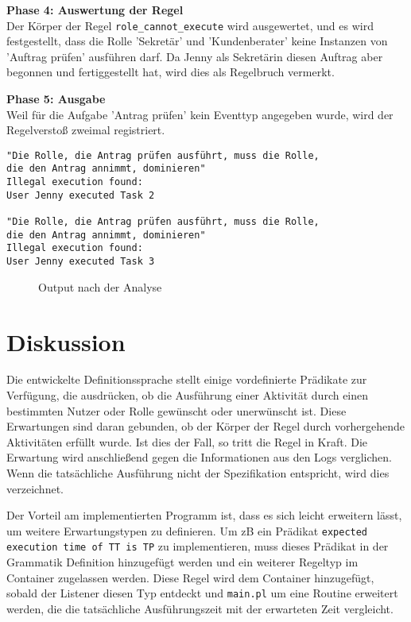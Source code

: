 \textbf{Phase 4: Auswertung der Regel}\\
Der Körper der Regel \texttt{role\_cannot\_execute} wird ausgewertet, und es wird festgestellt, dass die Rolle 'Sekretär' und 'Kundenberater' keine Instanzen von 'Auftrag prüfen' ausführen darf. Da Jenny als Sekretärin diesen Auftrag aber begonnen und fertiggestellt hat, wird dies als Regelbruch vermerkt.

\textbf{Phase 5: Ausgabe}\\
Weil für die Aufgabe 'Antrag prüfen' kein Eventtyp angegeben wurde, wird der Regelverstoß zweimal registriert.

\begin{verbatim}
"Die Rolle, die Antrag prüfen ausführt, muss die Rolle,
die den Antrag annimmt, dominieren"
Illegal execution found:
User Jenny executed Task 2

"Die Rolle, die Antrag prüfen ausführt, muss die Rolle,
die den Antrag annimmt, dominieren"
Illegal execution found:
User Jenny executed Task 3
\end{verbatim}
\begin{figure}[h!]
\caption{Output nach der Analyse}
\end{figure}

\section{Diskussion}

Die entwickelte Definitionssprache stellt einige vordefinierte Prädikate zur Verfügung, die ausdrücken, ob die Ausführung einer Aktivität durch einen bestimmten Nutzer oder Rolle gewünscht oder unerwünscht ist. Diese Erwartungen sind daran gebunden, ob der Körper der Regel durch vorhergehende Aktivitäten erfüllt wurde. Ist dies der Fall, so tritt die Regel in Kraft. Die Erwartung wird anschließend gegen die Informationen aus den Logs verglichen. Wenn die tatsächliche Ausführung nicht der Spezifikation entspricht, wird dies verzeichnet.

Der Vorteil am implementierten Programm ist, dass es sich leicht erweitern lässt, um weitere Erwartungstypen zu definieren. Um zB ein Prädikat \texttt{expected execution time of TT is TP} zu implementieren, muss dieses Prädikat in der Grammatik Definition hinzugefügt werden und ein weiterer Regeltyp im Container zugelassen werden. Diese Regel wird dem Container hinzugefügt, sobald der Listener diesen Typ entdeckt und \texttt{main.pl} um eine Routine erweitert werden, die die tatsächliche Ausführungszeit mit der erwarteten Zeit vergleicht.

